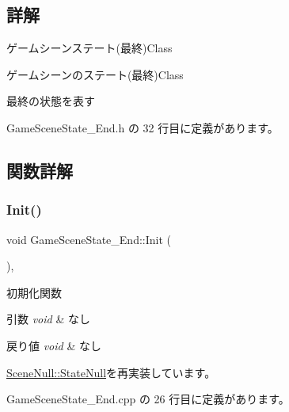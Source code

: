 \subsection{詳解}
ゲームシーンステート(最終)Class 

ゲームシーンのステート(最終)Class

最終の状態を表す 

 Game\+Scene\+State\+\_\+\+End.\+h の 32 行目に定義があります。



\subsection{関数詳解}
\mbox{\label{class_game_scene_state___end_a3b5c24eb6949215da331a20bdfbc55ae}} 
\subsubsection{\texorpdfstring{Init()}{Init()}}
{\footnotesize\ttfamily void Game\+Scene\+State\+\_\+\+End\+::\+Init (\begin{DoxyParamCaption}{ }\end{DoxyParamCaption})\hspace{0.3cm}{\ttfamily [override]}, {\ttfamily [virtual]}}



初期化関数 


\begin{DoxyParams}{引数}
{\em void} & なし \\
\hline
\end{DoxyParams}

\begin{DoxyRetVals}{戻り値}
{\em void} & なし \\
\hline
\end{DoxyRetVals}


\mbox{\hyperlink{class_scene_null_1_1_state_null_ac0b3f1adf01b580144337e37a847131f}{Scene\+Null\+::\+State\+Null}}を再実装しています。



 Game\+Scene\+State\+\_\+\+End.\+cpp の 26 行目に定義があります。

\mbox{\label{class_game_scene_state___end_a969c3c1ec9618cb495f49bc89bc10067}} 
